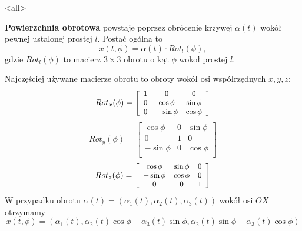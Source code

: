 \mode<all>{}
\begin{frame}[<+->]

\begin{definicja}
\textbf{Powierzchnia obrotowa} powstaje poprzez obrócenie krzywej $\alpha(t)$ 
wokół pewnej ustalonej prostej $l$. Postać ogólna to 
\[x(t,\phi)=\alpha(t)\cdot Rot_l(\phi),\] 
gdzie $Rot_l(\phi)$ to macierz $3\times 3$ obrotu o kąt $\phi$ wokoł prostej 
$l$.
\begin{center}

\end{center}
\end{definicja}
\end{frame}
\begin{frame}
Najczęściej używane macierze obrotu to obroty wok\'oł osi wsp\'ołrzędnych $x,y,z$:
\[\small Rot_{x}(\phi)=\left[\begin{array}{ccc}
1 & 0 & 0\\
0 & \cos\phi & \sin\phi\\
0 & -\sin\phi & \cos\phi\\
\end{array}\right]\]
\[
Rot_{y}(\phi)=\left[\begin{array}{ccc}
\cos\phi & 0 & \sin\phi\\
0 & 1 & 0\\
-\sin\phi & 0 & \cos\phi\\
\end{array}\right]\]
\[\small Rot_{z}(\phi)=\left[\begin{array}{ccc}
\cos\phi & \sin\phi & 0 \\
-\sin\phi & \cos\phi & 0\\
0 & 0 & 1\\
\end{array}\right]\]
\pause W przypadku obrotu $\alpha (t)=(\alpha_1(t),\alpha_2(t),\alpha_3(t))$ 
wok\'oł osi $OX$ otrzymamy
\[x(t,\phi)=\left(\alpha_1(t),\alpha_2(t)\cos\phi-\alpha_3(t)\sin\phi,
\alpha_2 (t)\sin\phi+\alpha_3 (t)\cos\phi\right)\]

\end{frame}



